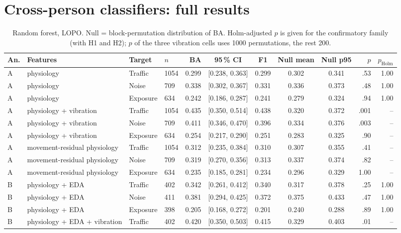 \documentclass[runningheads]{llncs}
\begin{document}
\section{Cross-person classifiers: full results}
\begin{table}[h]
\caption{Random forest, LOPO. Null = block-permutation distribution of BA. Holm-adjusted $p$ is given for the confirmatory family (with H1 and H2); $p$ of the three vibration cells uses 1000 permutations, the rest 200.}
\tiny\centering
\begin{tabular}{@{}llllrccccrr@{}}
\toprule
An. & Features & Target & $n$ & BA & 95\,\% CI & F1 & Null mean & Null p95 & $p$ & $p_\mathrm{Holm}$\\
\midrule
A & physiology & Traffic & 1054 & 0.299 & [0.238, 0.363] & 0.299 & 0.302 & 0.341 & .53 & 1.00\\
A & physiology & Noise & 709 & 0.338 & [0.302, 0.367] & 0.331 & 0.336 & 0.373 & .48 & 1.00\\
A & physiology & Exposure & 634 & 0.242 & [0.186, 0.287] & 0.241 & 0.279 & 0.324 & .94 & 1.00\\
A & physiology + vibration & Traffic & 1054 & 0.435 & [0.350, 0.514] & 0.438 & 0.320 & 0.372 & .001 & --\\
A & physiology + vibration & Noise & 709 & 0.411 & [0.346, 0.470] & 0.396 & 0.334 & 0.376 & .003 & --\\
A & physiology + vibration & Exposure & 634 & 0.254 & [0.217, 0.290] & 0.251 & 0.283 & 0.325 & .90 & --\\
A & movement-residual physiology & Traffic & 1054 & 0.312 & [0.235, 0.384] & 0.310 & 0.307 & 0.355 & .41 & --\\
A & movement-residual physiology & Noise & 709 & 0.319 & [0.270, 0.356] & 0.313 & 0.337 & 0.374 & .82 & --\\
A & movement-residual physiology & Exposure & 634 & 0.235 & [0.185, 0.281] & 0.234 & 0.296 & 0.329 & 1.00 & --\\
B & physiology + EDA & Traffic & 402 & 0.342 & [0.261, 0.412] & 0.340 & 0.317 & 0.378 & .25 & 1.00\\
B & physiology + EDA & Noise & 411 & 0.381 & [0.294, 0.425] & 0.372 & 0.375 & 0.433 & .47 & 1.00\\
B & physiology + EDA & Exposure & 398 & 0.205 & [0.168, 0.272] & 0.201 & 0.240 & 0.288 & .89 & 1.00\\
B & physiology + EDA + vibration & Traffic & 402 & 0.420 & [0.350, 0.503] & 0.415 & 0.329 & 0.403 & .01 & --\\

\end{tabular}
\end{table}
\end{document}
